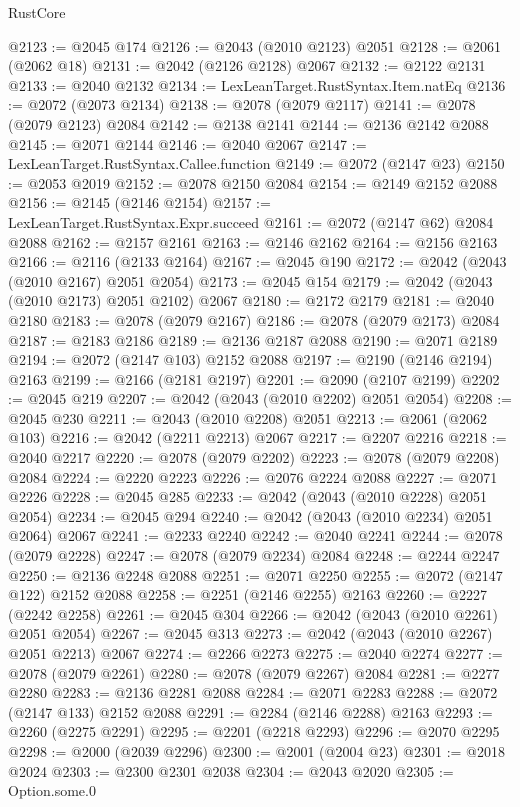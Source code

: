 \begin{lexlean}{RustCore}
\begin{coremodule}
@2123 := @2045 @174
@2126 := @2043 (@2010 @2123) @2051
@2128 := @2061 (@2062 @18)
@2131 := @2042 (@2126 @2128) @2067
@2132 := @2122 @2131
@2133 := @2040 @2132
@2134 := LexLeanTarget.RustSyntax.Item.natEq
@2136 := @2072 (@2073 @2134)
@2138 := @2078 (@2079 @2117)
@2141 := @2078 (@2079 @2123) @2084
@2142 := @2138 @2141
@2144 := @2136 @2142 @2088
@2145 := @2071 @2144
@2146 := @2040 @2067
@2147 := LexLeanTarget.RustSyntax.Callee.function
@2149 := @2072 (@2147 @23)
@2150 := @2053 @2019
@2152 := @2078 @2150 @2084
@2154 := @2149 @2152 @2088
@2156 := @2145 (@2146 @2154)
@2157 := LexLeanTarget.RustSyntax.Expr.succeed
@2161 := @2072 (@2147 @62) @2084 @2088
@2162 := @2157 @2161
@2163 := @2146 @2162
@2164 := @2156 @2163
@2166 := @2116 (@2133 @2164)
@2167 := @2045 @190
@2172 := @2042 (@2043 (@2010 @2167) @2051 @2054)
@2173 := @2045 @154
@2179 := @2042 (@2043 (@2010 @2173) @2051 @2102) @2067
@2180 := @2172 @2179
@2181 := @2040 @2180
@2183 := @2078 (@2079 @2167)
@2186 := @2078 (@2079 @2173) @2084
@2187 := @2183 @2186
@2189 := @2136 @2187 @2088
@2190 := @2071 @2189
@2194 := @2072 (@2147 @103) @2152 @2088
@2197 := @2190 (@2146 @2194) @2163
@2199 := @2166 (@2181 @2197)
@2201 := @2090 (@2107 @2199)
@2202 := @2045 @219
@2207 := @2042 (@2043 (@2010 @2202) @2051 @2054)
@2208 := @2045 @230
@2211 := @2043 (@2010 @2208) @2051
@2213 := @2061 (@2062 @103)
@2216 := @2042 (@2211 @2213) @2067
@2217 := @2207 @2216
@2218 := @2040 @2217
@2220 := @2078 (@2079 @2202)
@2223 := @2078 (@2079 @2208) @2084
@2224 := @2220 @2223
@2226 := @2076 @2224 @2088
@2227 := @2071 @2226
@2228 := @2045 @285
@2233 := @2042 (@2043 (@2010 @2228) @2051 @2054)
@2234 := @2045 @294
@2240 := @2042 (@2043 (@2010 @2234) @2051 @2064) @2067
@2241 := @2233 @2240
@2242 := @2040 @2241
@2244 := @2078 (@2079 @2228)
@2247 := @2078 (@2079 @2234) @2084
@2248 := @2244 @2247
@2250 := @2136 @2248 @2088
@2251 := @2071 @2250
@2255 := @2072 (@2147 @122) @2152 @2088
@2258 := @2251 (@2146 @2255) @2163
@2260 := @2227 (@2242 @2258)
@2261 := @2045 @304
@2266 := @2042 (@2043 (@2010 @2261) @2051 @2054)
@2267 := @2045 @313
@2273 := @2042 (@2043 (@2010 @2267) @2051 @2213) @2067
@2274 := @2266 @2273
@2275 := @2040 @2274
@2277 := @2078 (@2079 @2261)
@2280 := @2078 (@2079 @2267) @2084
@2281 := @2277 @2280
@2283 := @2136 @2281 @2088
@2284 := @2071 @2283
@2288 := @2072 (@2147 @133) @2152 @2088
@2291 := @2284 (@2146 @2288) @2163
@2293 := @2260 (@2275 @2291)
@2295 := @2201 (@2218 @2293)
@2296 := @2070 @2295
@2298 := @2000 (@2039 @2296)
@2300 := @2001 (@2004 @23)
@2301 := @2018 @2024
@2303 := @2300 @2301 @2038
@2304 := @2043 @2020
@2305 := Option.some.{0}

\end{coremodule}
\end{lexlean}
